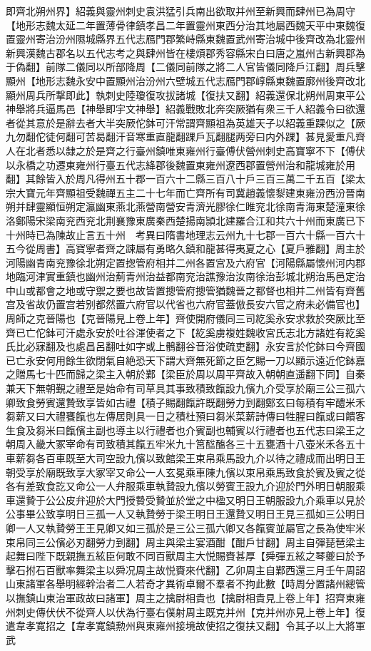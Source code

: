 即齊北朔州界】紹義與靈州刺史袁洪猛引兵南出欲取并州至新興而肆州已為周守【地形志魏太延二年置薄骨律鎮孝昌二年置靈州東西分治其地屬西魏天平中東魏復置靈州寄治汾州隰城縣界五代志鴈門郡繁峙縣東魏置武州寄治城中後齊改為北靈州新興漢魏古郡名以五代志考之與肆州皆在樓煩郡秀容縣宋白曰唐之嵐州古新興郡為于偽翻】前隊二儀同以所部降周【二儀同前隊之將二人官皆儀同降戶江翻】周兵擊顯州【地形志魏永安中置顯州治汾州六壁城五代志鴈門郡崞縣東魏置廓州後齊改北顯州周兵所撃即此】執刺史陸瓊復攻拔諸城【復扶又翻】紹義還保北朔州周東平公神舉將兵逼馬邑【神舉即宇文神舉】紹義戰敗北奔突厥猶有衆三千人紹義令曰欲還者從其意於是辭去者大半突厥佗鉢可汗常謂齊顯祖為英雄天子以紹義重踝似之【厥九勿翻佗徒何翻可苦曷翻汗音寒重直龍翻踝戶瓦翻腿两旁曰内外踝】甚見愛重凡齊人在北者悉以隸之於是齊之行臺州鎮唯東雍州行臺傅伏營州刺史高寶寧不下【傅伏以永橋之功遷東雍州行臺五代志絳郡後魏置東雍州遼西郡置營州治和龍城雍於用翻】其餘皆入於周凡得州五十郡一百六十二縣三百八十戶三百三萬二千五百【梁太宗大寶元年齊顯祖受魏禪五主二十七年而亡齊所有司冀趙義懷㴝建東雍汾西汾晉南朔并肆靈顯恒朔定瀛幽東燕北燕營南營安青濟光膠徐仁睢兖北徐南青海東楚潼東徐洛鄭陽宋梁南兖西兖北荆襄豫東廣秦西楚揚南頴北建羅合江和共六十州而東廣已下十州時已為陳故止言五十州　考異曰隋書地理志云州九十七郡一百六十縣一百六十五今從周書】高寶寧者齊之踈屬有勇略久鎮和龍甚得夷夏之心【夏戶雅翻】周主於河陽幽青南兖豫徐北朔定置揔管府相并二州各置宫及六府官【河陽縣屬懷州河内郡地臨河津實重鎮也幽州治薊青州治益都南兖治譙豫治汝南徐治彭城北朔治馬邑定治中山或都會之地或守禦之要也故皆置摠管府摠管猶魏晉之都督也相并二州皆有齊舊宫及省故仍置宫若别都然置六府官以代省也六府官蓋倣長安六官之府未必備官也】周師之克晉陽也【克晉陽見上卷上年】齊使開府儀同三司紇奚永安求救於突厥比至齊已亡佗鉢可汗處永安於吐谷渾使者之下【紇奚虜複姓魏收宮氏志北方諸姓有紇奚氏比必寐翻及也處昌呂翻吐如字或上鶻翻谷音浴使疏吏翻】永安言於佗鉢曰今齊國已亡永安何用餘生欲閉氣自絶恐天下謂大齊無死節之臣乞賜一刀以顯示遠近佗鉢嘉之贈馬七十匹而歸之梁主入朝於鄴【梁臣於周以周平齊故入朝朝直遥翻下同】自秦兼天下無朝覲之禮至是始命有司草具其事致積致餼設九儐九介受享於廟三公三孤六卿致食勞賓還贄致享皆如古禮【積子賜翻餼許既翻勞力到翻鄭玄曰每積有牢醴米禾芻薪又曰大禮饔餼也左傳居則具一日之積杜預曰芻米菜薪詩傳曰牲腥曰餼或曰饋客生食及芻米曰餼儐主副也導主以行禮者也介賓副也輔賓以行禮者也五代志曰梁王之朝周入畿大冢宰命有司致積其餼五牢米九十筥䤈醢各三十五甕酒十八壺米禾各五十車薪芻各百車既至大司空設九儐以致館梁王束帛乘馬設九介以待之禮成而出明日王朝受享於廟既致享大冢宰又命公一人玄冕乘車陳九儐以束帛乘馬致食於賓及賓之從各有差致食訖又命公一人弁服乘車執贄設九儐以勞賓王設九介迎於門外明日朝服乘車還贄于公公皮弁迎於大門授䞇受贄並於堂之中楹又明日王朝服設九介乘車以見於公事畢公致享明日三孤一人又執贄勞于梁王明日王還贄又明日王見三孤如三公明日卿一人又執贄勞王王見卿又如三孤於是三公三孤六卿又各餼賓並屬官之長為使牢米束帛同三公儐必刃翻勞力到翻】周主與梁主宴酒酣【酣戶甘翻】周主自彈琵琶梁主起舞曰陛下既親撫五絃臣何敢不同百獸周主大悦賜賚甚厚【舜彈五絃之琴夔曰於予擊石拊石百獸率舞梁主以舜况周主故悦賚來代翻】乙卯周主自鄴西還三月壬午周詔山東諸軍各舉明經幹治者二人若奇才異術卓爾不羣者不拘此數【時周分置諸州總管以撫鎮山東治軍政故曰諸軍】周主之擒尉相貴也【擒尉相貴見上卷上年】招齊東雍州刺史傳伏伏不從齊人以伏為行臺右僕射周主既克并州【克并州亦見上卷上年】復遣韋孝寛招之【韋孝寛鎮勲州與東雍州接境故使招之復扶又翻】令其子以上大將軍武